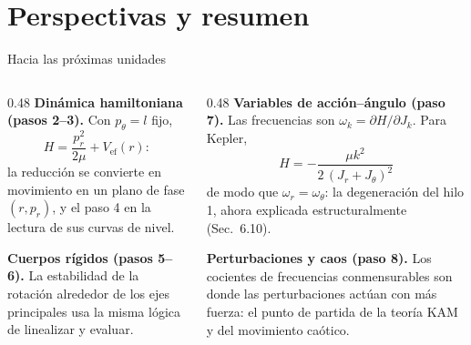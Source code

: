\documentclass[11pt]{beamer}
\newcommand{\Vef}{V_{\mathrm{ef}}}
\begin{document}
\section{Perspectivas y resumen}

\begin{frame}{Hacia las próximas unidades}
\footnotesize
\begin{columns}[T]
\begin{column}{0.48\textwidth}
\textbf{Dinámica hamiltoniana (pasos 2--3).} Con $p_\theta=l$ fijo,
\[
H=\frac{p_r^2}{2\mu}+\Vef(r):
\]
la reducción se convierte en movimiento en un plano de fase $(r,p_r)$, y el paso 4 en la lectura de sus curvas de nivel.

\vspace{0.3em}
\textbf{Cuerpos rígidos (pasos 5--6).} La estabilidad de la rotación alrededor de los ejes principales usa la misma lógica de linealizar y evaluar.
\end{column}
\begin{column}{0.48\textwidth}
\textbf{Variables de acción--ángulo (paso 7).} Las frecuencias son $\omega_k=\partial H/\partial J_k$. Para Kepler,
\[
H=-\frac{\mu k^2}{2\,(J_r+J_\theta)^2}
\]
de modo que $\omega_r=\omega_\theta$: la degeneración del hilo 1, ahora explicada estructuralmente (Sec.~6.10).

\vspace{0.3em}
\textbf{Perturbaciones y caos (paso 8).} Los cocientes de frecuencias conmensurables son donde las perturbaciones actúan con más fuerza: el punto de partida de la teoría KAM y del movimiento caótico.
\end{column}
\end{columns}
\end{frame}
\end{document}
